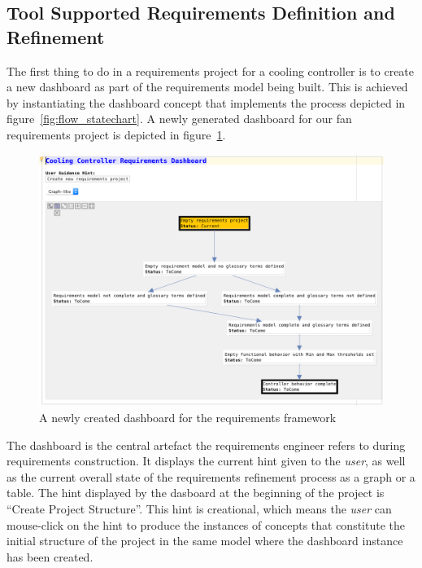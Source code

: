 \subsection*{Tool Supported Requirements Definition and Refinement}
\vspace{-.3cm}
The first thing to do in a requirements project for a cooling controller is to
create a new dashboard as part of the requirements model being built. This is
achieved by instantiating the \textsf{dashboard} concept that implements the
process depicted in figure~\ref{fig:flow_statechart}. A newly generated
dashboard for our fan requirements project is depicted in figure~\ref{fig:empty_dashboard}.
\vspace{-0cm}
\begin{figure}[!h]
\centering 
\includegraphics[width=.8\textwidth]{./figures/NewDashboard.png}
\caption{A newly created dashboard for the requirements framework}
\label{fig:empty_dashboard}
\vspace{-.7cm}
\end{figure}
The dashboard is the central artefact the requirements engineer refers to during
requirements construction. It displays the current hint given to the
\emph{user}, as well as the current overall state of the requirements refinement
process as a graph or a table. The hint displayed by the dasboard at the
beginning of the project is ``Create Project Structure''. This hint is
creational, which means the \emph{user} can mouse-click on the hint to produce
the instances of concepts that constitute the initial structure of the project in the same model where the
dashboard instance has been created.


